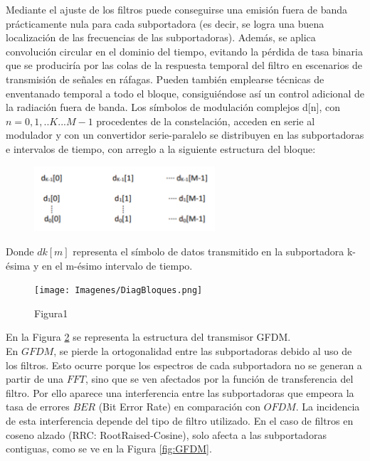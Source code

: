 \documentclass[]{article}
\begin{document}
Mediante el ajuste de los filtros puede conseguirse una emisión fuera de banda prácticamente nula para cada subportadora (es decir, se logra una buena localización de las frecuencias de las subportadoras). Además, se aplica convolución circular en el dominio del tiempo, evitando la pérdida de tasa binaria que se produciría por las colas de la respuesta temporal del filtro en escenarios de transmisión de señales en ráfagas. Pueden también emplearse técnicas de enventanado temporal a todo el bloque, consiguiéndose así un control adicional de la radiación fuera de banda. 
Los símbolos de modulación complejos d[n], con $n = 0,1,..K...M-1$ procedentes de la constelación, acceden en serie al modulador y con un convertidor serie-paralelo se distribuyen en las subportadoras e intervalos de tiempo, con arreglo a la siguiente estructura del bloque:\\

\begin{figure}[h!]
\centering
\includegraphics[width=0.6\textwidth]{Imagenes/matriz.png}
\label{fig:matriz}
\end{figure}

Donde $dk[m]$ representa el símbolo de datos transmitido en la subportadora k-ésima y en el m-ésimo intervalo de tiempo.\\

\begin{figure}[h!]
	\centering
	\texttt{[image: Imagenes/DiagBloques.png]}
	\caption{Figura1}
	\label{fig:DiagBloques}
\end{figure}
 
En la Figura \ref{fig:DiagBloques} se representa la estructura del transmisor GFDM.\\



En $GFDM$, se pierde la ortogonalidad entre las subportadoras debido al uso de los filtros. Esto ocurre porque los espectros de cada subportadora no se generan a partir de una $FFT$, sino que se ven afectados por la función de transferencia del filtro. Por ello aparece una interferencia entre las subportadoras que empeora la tasa de errores $BER$ (Bit Error Rate) en comparación con $OFDM$. La incidencia de esta interferencia depende del tipo de filtro utilizado. En el caso de filtros en coseno alzado (RRC: RootRaised-Cosine), solo afecta a las subportadoras contiguas, como se ve en la Figura \ref{fig:GFDM}.\\
\end{document}

